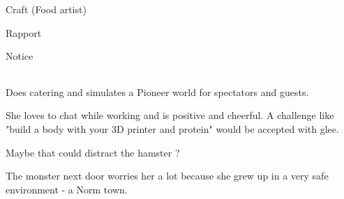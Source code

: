 \begin{npcBox}[title=Cherie]

    \begin{aspects}
    \item {}
    \item {}    
    \item {}    
    \end{aspects}
    
    \begin{skills}
    \item {} Craft (Food artist)
    \item {} Rapport
    \item {} Notice    
    \end{skills}
    
    \begin{stunts}
    \item {}
    \end{stunts}
    
    \begin{stressSection}
    \end{stressSection}
    \begin{tabularx}{\textwidth}{ XX }
    \end{tabularx}
    
    \begin{consequences}
    \item {}
    \item {}
    \item {}
    \end{consequences}
    
    \begin{npcDescription}
    Does catering and simulates a Pioneer world for spectators and guests.
    
    She loves to chat while working and is positive and cheerful. A challenge like "build a body with your 3D printer and protein" would be accepted with glee.

    Maybe that could distract the hamster ?

    The monster next door worries her a lot because she grew up in a very safe environment - a Norm town.

    \end{npcDescription}
    
\end{npcBox}



